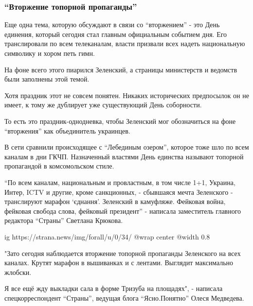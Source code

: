  
 
 
 
 

\subsubsection{\enquote{Вторжение топорной пропаганды}}

Еще одна тема, которую обсуждают в связи со \enquote{вторжением} - это День единения,
который сегодня стал главным официальным событием дня. Его транслировали по
всем телеканалам, власти призвали всех надеть национальную символику и хором
петь гимн.

На фоне всего этого пиарился Зеленский, а страницы министерств и ведомств были
заполнены этой темой. 

Хотя праздник этот не совсем понятен. Никаких исторических предпосылок он не
имеет, к тому же дублирует уже существующий День соборности. 

То есть это праздник-однодневка, чтобы Зеленский мог обозначиться на фоне
\enquote{вторжения} как объединитель украинцев. 

В сети сравнили происходящее с \enquote{Лебединым озером}, которое тоже шло по всем
каналам в дни ГКЧП. Назначенный властями День единства называют топорной
пропагандой в комсомольском стиле.

\enquote{По всем каналам, национальным и провластным, в том числе 1+1, Украина, Интер,
ICTV и другие, кроме санкционных, - сбывшаяся мечта Зеленского - транслируют
марафон \enquote{єднання}. Зеленский в камуфляже. Фейковая война, фейковая свобода
слова, фейковый президент} - написала заместитель главного редактора \enquote{Страны}
Светлана Крюкова.

\ifcmt
  ig https://strana.news/img/forall/u/0/34/%
  @wrap center
  @width 0.8
\fi

"Зато сегодня наблюдается вторжение топорной пропаганды Зеленского на всех
каналах. Крутят марафон в вышиванках и с лентами. Выглядит максимально жлобски.

Я все ещё жду выкладки сала в форме Тризуба на площадях", - написала
спецкорреспондент \enquote{Страны}, ведущая блога \enquote{Ясно.Понятно} Олеся Медведева.

